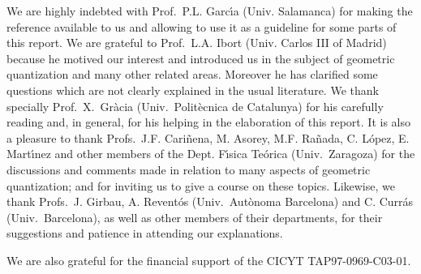 \documentclass[12pt]{article}
\begin{document}
We are highly indebted with Prof.\ P.L. Garc\'{\i}a (Univ. Salamanca)
for making the reference \cite{Ga-83} available to us and allowing to
use it
as a guideline for some parts of this report.
We are grateful to Prof.\ L.A. Ibort (Univ. Carlos III of Madrid)
because he motived our interest and introduced us
in the subject of geometric quantization and many
other related areas. Moreover he has clarified some questions
which are not clearly explained in the usual literature.
We thank specially Prof.\ X.~Gr\`acia (Univ.\ Polit\`ecnica de
Catalunya)
for his carefully reading and, in general, for his helping in the
elaboration of this report.
It is also a pleasure to thank
Profs.\ J.F. Cari\~nena, M. Asorey, M.F. Ra\~nada, C. L\'opez, E.
Mart\'{\i}nez
and other members of the Dept. F\'{\i}sica Te\'orica (Univ.\ Zaragoza)
for the discussions and comments made in relation
to many aspects of geometric quantization;
and for inviting us to give a course on these topics.
Likewise, we thank
Profs.\ J. Girbau, A. Revent\'os (Univ.\ Aut\`onoma Barcelona)
and C. Curr\'as (Univ.\ Barcelona),
as well as other members of their departments,
for their suggestions and patience in attending our explanations.

We are also grateful for the financial support
of the CICYT TAP97-0969-C03-01.
\end{document}
